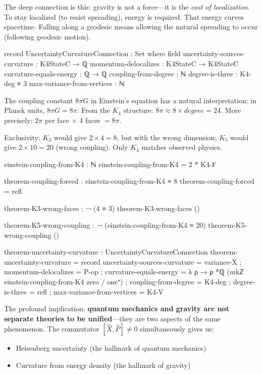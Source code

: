 \documentclass[11pt,a4paper]{book}
\def\text#1{#1}%
\begin{document}
The deep connection is this: gravity is not a force---it is the \emph{cost of localization}. To stay localized (to resist spreading), energy is required. That energy curves spacetime. Falling along a geodesic means allowing the natural spreading to occur (following geodesic motion).

\begin{code}
record UncertaintyCurvatureConnection : Set where
  field
    uncertainty-sources-curvature : K4StateC → ℚ
    momentum-delocalizes : K4StateC → K4StateC  
    curvature-equals-energy : ℚ → ℚ
    coupling-from-degree : ℕ
    degree-is-three : K4-deg ≡ 3
    max-variance-from-vertices : ℕ
\end{code}

The coupling constant $8\pi G$ in Einstein's equation has a natural interpretation: in Planck units, $8\pi G = 8\pi$. From the $K_4$ structure: $8\pi \approx 8 \times \text{degree} = 24$. More precisely: $2\pi$ per face $\times$ 4 faces $= 8\pi$.

Exclusivity: $K_3$ would give $2 \times 4 = 8$, but with the wrong dimension; $K_5$ would give $2 \times 10 = 20$ (wrong coupling). Only $K_4$ matches observed physics.

\begin{code}
einstein-coupling-from-K4 : ℕ
einstein-coupling-from-K4 = 2 * K4-F

theorem-coupling-forced : einstein-coupling-from-K4 ≡ 8
theorem-coupling-forced = refl

theorem-K3-wrong-faces : ¬ (4 ≡ 3)
theorem-K3-wrong-faces ()

theorem-K5-wrong-coupling : ¬ (einstein-coupling-from-K4 ≡ 20)
theorem-K5-wrong-coupling ()

theorem-uncertainty-curvature : UncertaintyCurvatureConnection
theorem-uncertainty-curvature = record
  { uncertainty-sources-curvature = variance-X
  ; momentum-delocalizes = P-op
  ; curvature-equals-energy = λ ρ → ρ *ℚ (mkℤ einstein-coupling-from-K4 zero / one⁺)
  ; coupling-from-degree = K4-deg
  ; degree-is-three = refl
  ; max-variance-from-vertices = K4-V
  }
\end{code}

The profound implication: \textbf{quantum mechanics and gravity are not 
separate theories to be unified}---they are two aspects of the same 
phenomenon. The commutator $[\hat{X},\hat{P}] \neq 0$ simultaneously gives us:
\begin{itemize}
\item Heisenberg uncertainty (the hallmark of quantum mechanics)
\item Curvature from energy density (the hallmark of gravity)
\end{itemize}
\end{document}
